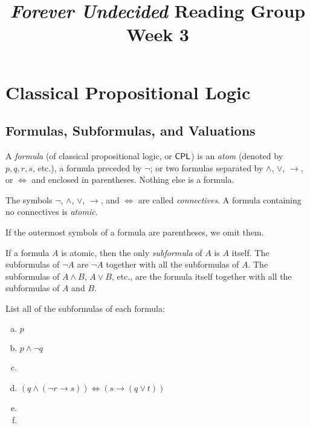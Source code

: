 \documentclass{article}
\title{\emph{Forever Undecided} Reading Group \\ Week 3}
\date{}
\author{}
\begin{document}
\maketitle

\section*{Classical Propositional Logic}

\subsection*{Formulas, Subformulas, and Valuations}

\begin{definition}
    A \emph{formula} (of classical propositional logic, or $\mathsf{CPL}$) is an \emph{atom} (denoted by $p, q, r, s$, etc.), a formula preceded by $\neg$; or two formulas separated by $\wedge$, $\vee$, $\to$, or $\iff$ and enclosed in parentheses. Nothing else is a formula. 
\end{definition}

\begin{definition}    
    The symbols $\neg$, $\wedge$, $\vee$, $\to$, and $\iff$ are called \emph{connectives}. A formula containing no connectives is \emph{atomic}.
\end{definition}

\begin{notation}
    If the outermost symbols of a formula are parentheses, we omit them.
\end{notation}

\begin{definition}
    If a formula $A$ is atomic, then the only \emph{subformula} of $A$ is $A$ itself. The subformulas of $\neg A$ are $\neg A$ together with all the subformulas of $A$. The subformulas of $A \wedge B$, $A \vee B$, etc., are the formula itself together with all the subformulas of $A$ and $B$.
\end{definition}

\begin{prob}{3.1}
List all of the subformulas of each formula:
    \begin{multicols}{2}
    \begin{enumerate}[a)]
        \item $p$
        \item $p \wedge \neg q$
        \item
        \item $(q \wedge (\neg r \to s)) \iff (s \to (q \vee t))$
        \item
        \item
    \end{enumerate}
    \end{multicols}
\end{prob}
\end{document}
